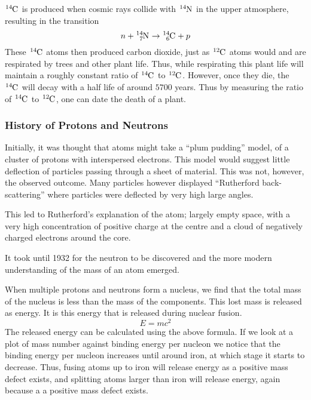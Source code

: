 \documentclass[12pt]{report}
\begin{document}
\begin{flushleft}
\(\tensor*[^{14}]{\mathrm{C}}{}\) is produced when cosmic rays collide with
\(\tensor*[^{14}]{\mathrm{N}}{}\) in the upper atmosphere, resulting in the
transition
\[n + \tensor*[^{14}_7]{\mathrm{N}}{} \rightarrow
\tensor*[^{14}_6]{\mathrm{C}}{} + p\]
These \(\tensor*[^{14}]{\mathrm{C}}{}\) atoms then produced carbon dioxide,
just as \(\tensor*[^{12}]{\mathrm{C}}{}\) atoms would and are respirated by
trees and other plant life. Thus, while respirating this plant life will
maintain a roughly constant ratio of \(\tensor*[^{14}]{\mathrm{C}}{}\) to
\(\tensor*[^{12}]{\mathrm{C}}{}\). However, once they die, the
\(\tensor*[^{14}]{\mathrm{C}}{}\) will decay with a half life of around
\(5700\) years. Thus by measuring the ratio of
\(\tensor*[^{14}]{\mathrm{C}}{}\) to \(\tensor*[^{12}]{\mathrm{C}}{}\), one
can date the death of a plant.

\subsubsection*{History of Protons and Neutrons}

Initially, it was thought that atoms might take a ``plum pudding'' model, of
a cluster of protons with interspersed electrons. This model would suggest
little deflection of particles passing through a sheet of material. This was
not, however, the observed outcome. Many particles however displayed
``Rutherford back-scattering'' where particles were deflected by very high
large angles. \par
This led to Rutherford's explanation of the atom; largely empty space, with
a very high concentration of positive charge at the centre and a cloud of
negatively charged electrons around the core. \par
It took until 1932 for the neutron to be discovered and the more modern
understanding of the mass of an atom emerged.

\bigskip

When multiple protons and neutrons form a nucleus, we find that the total
mass of the nucleus is less than the mass of the components. This lost mass is
released as energy. It is this energy that is released during nuclear fusion.
\[E = mc^2\]
The released energy can be calculated using the above formula. If we look at
a plot of mass number against binding energy per nucleon we notice that the 
binding energy per nucleon increases until around iron, at which stage it
starts to decrease. Thus, fusing atoms up to iron will release energy as a
positive mass defect exists, and splitting atoms larger than iron will release
energy, again because a a positive mass defect exists.


\end{flushleft}
\end{document}
